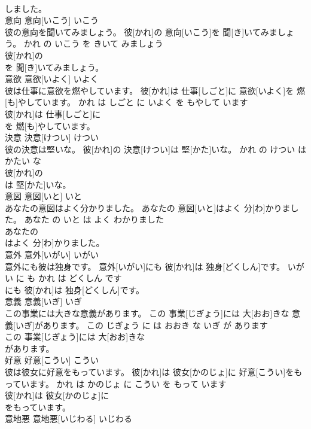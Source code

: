 \documentclass[8pt]{extreport}
\begin{document}
\begin{CJK}{UTF8}{min}
\\	しました。			
\\	意向	意向[いこう]	いこう	
\\	彼の意向を聞いてみましょう。	彼[かれ]の 意向[いこう]を 聞[き]いてみましょう。	かれ の いこう を きいて みましょう	
\\	彼[かれ]の
\\	を 聞[き]いてみましょう。			
\\	意欲	意欲[いよく]	いよく	
\\	彼は仕事に意欲を燃やしています。	彼[かれ]は 仕事[しごと]に 意欲[いよく]を 燃[も]やしています。	かれ は しごと に いよく を もやして います	
\\	彼[かれ]は 仕事[しごと]に
\\	を 燃[も]やしています。			
\\	決意	決意[けつい]	けつい	
\\	彼の決意は堅いな。	彼[かれ]の 決意[けつい]は 堅[かた]いな。	かれ の けつい は かたい な	
\\	彼[かれ]の
\\	は 堅[かた]いな。			
\\	意図	意図[いと]	いと	
\\	あなたの意図はよく分かりました。	あなたの 意図[いと]はよく 分[わ]かりました。	あなた の いと は よく わかりました	
\\	あなたの
\\	はよく 分[わ]かりました。			
\\	意外	意外[いがい]	いがい	
\\	意外にも彼は独身です。	意外[いがい]にも 彼[かれ]は 独身[どくしん]です。	いがい に も かれ は どくしん です	
\\	にも 彼[かれ]は 独身[どくしん]です。			
\\	意義	意義[いぎ]	いぎ	
\\	この事業には大きな意義があります。	この 事業[じぎょう]には 大[おお]きな 意義[いぎ]があります。	この じぎょう に は おおき な いぎ が あります	
\\	この 事業[じぎょう]には 大[おお]きな
\\	があります。			
\\	好意	好意[こうい]	こうい	
\\	彼は彼女に好意をもっています。	彼[かれ]は 彼女[かのじょ]に 好意[こうい]をもっています。	かれ は かのじょ に こうい を もって います	
\\	彼[かれ]は 彼女[かのじょ]に
\\	をもっています。			
\\	意地悪	意地悪[いじわる]	いじわる	

\end{CJK}
\end{document}
